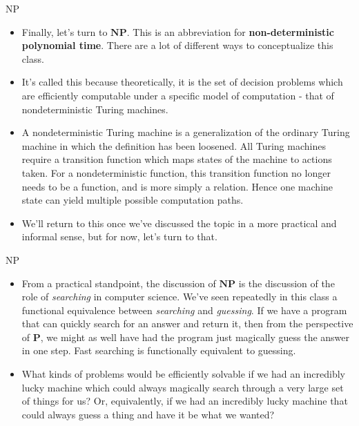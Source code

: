 \documentclass{beamer}
\begin{document}
\begin{frame}{NP}
    \begin{itemize}
        \item Finally, let's turn to $\mathbf{NP}$. This is an abbreviation for \textbf{non-deterministic polynomial time}. There are a lot of different ways to conceptualize this class. 
        \item It's called this because theoretically, it is the set of decision problems which are efficiently computable under a specific model of computation - that of nondeterministic Turing machines. 
        \item A nondeterministic Turing machine is a generalization of the ordinary Turing machine in which the definition has been loosened. All Turing machines require a transition function which maps states of the machine to actions taken. For a nondeterministic function, this transition function no longer needs to be a function, and is more simply a relation. Hence one machine state can yield multiple possible computation paths. 
        \item We'll return to this once we've discussed the topic in a more practical and informal sense, but for now, let's turn to that. 
    \end{itemize}
\end{frame}

\begin{frame}{NP}
    \begin{itemize}
        \item From a practical standpoint, the discussion of $\mathbf{NP}$ is the discussion of the role of \emph{searching} in computer science. We've seen repeatedly in this class a functional equivalence between \emph{searching} and \emph{guessing}. If we have a program that can quickly search for an answer and return it, then from the perspective of $\mathbf{P}$, we might as well have had the program just magically guess the answer in one step. Fast searching is functionally equivalent to guessing. 
        \item What kinds of problems would be efficiently solvable if we had an incredibly lucky machine which could always magically search through a very large set of things for us? Or, equivalently, if we had an incredibly lucky machine that could always guess a thing and have it be what we wanted?
    \end{itemize}
\end{frame}
\end{document}
